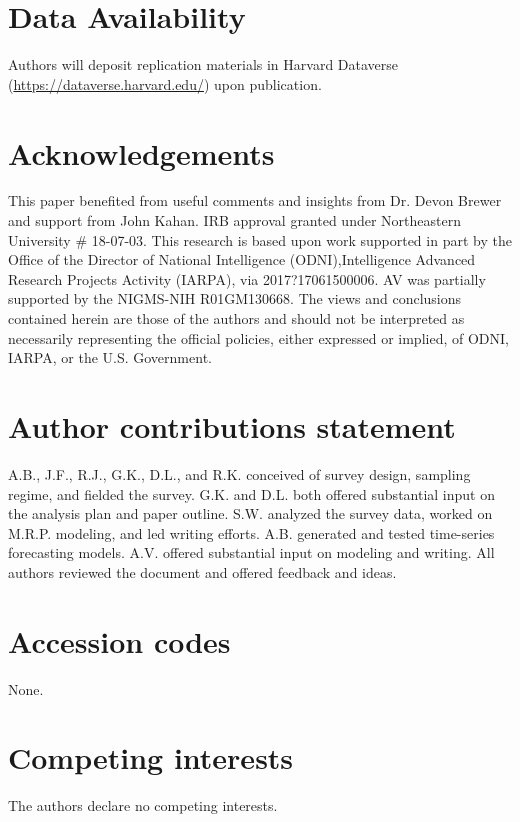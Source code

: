 \documentclass[fleqn,10pt]{wlscirep}
\begin{document}


\section*{Data Availability}
Authors will deposit replication materials in Harvard Dataverse (\url{https://dataverse.harvard.edu/}) upon publication. 






\section*{Acknowledgements}

This paper benefited from useful comments and insights from Dr. Devon Brewer and support from John Kahan. IRB approval granted under Northeastern University \# 18-07-03. This research is based upon work supported in part by the Office of the Director of National Intelligence (ODNI),Intelligence Advanced Research Projects Activity (IARPA), via 2017?17061500006. AV was partially supported by the NIGMS-NIH R01GM130668. The views and conclusions contained herein are those of the authors and should not be interpreted as necessarily representing the official policies, either expressed or implied, of ODNI, IARPA, or the U.S. Government.

\section*{Author contributions statement}

A.B., J.F., R.J., G.K., D.L., and R.K. conceived of survey design, sampling regime, and fielded the survey. G.K. and D.L. both offered substantial input on the analysis plan and paper outline. S.W. analyzed the survey data, worked on M.R.P. modeling, and led writing efforts. A.B. generated and tested time-series forecasting models. A.V. offered substantial input on modeling and writing. All authors reviewed the document and offered feedback and ideas. 

\section*{Accession codes}
None.

\section*{Competing interests}

The authors declare no competing interests. 
\end{document}
